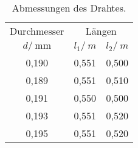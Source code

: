 \begin{table}[H]
	\centering
	\begin{tabular}{c cc}
		\toprule
		{Durchmesser} & \multicolumn{2}{c}{Längen} \\
		{$d/\:\si{\milli\meter}$} & {$l_1/\:\si{m}$} & {$l_2/\:\si{m}$}\\
		\midrule
			0,190 & 0,551 & 0,500 \\
			0,189 & 0,551 & 0,510 \\
			0,191 & 0,550 & 0,500 \\
			0,193 & 0,551 & 0,520 \\
			0,195 & 0,551 & 0,520 \\
		\bottomrule
	\end{tabular}
	\caption{Abmessungen des Drahtes.}
	\label{tab:draht}
\end{table}